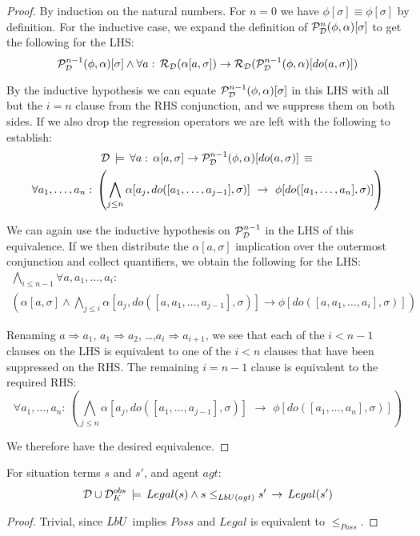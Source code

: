\begin{proof}
By induction on the natural numbers. For $n=0$ we have $\phi[\sigma]\equiv\phi[\sigma]$
by definition. For the inductive case, we expand the definition of
$\mathcal{P}_{\mathcal{D}}^{n}(\phi,\alpha)[\sigma]$ to get the following for the
LHS:\[
\mathcal{P}_{\mathcal{D}}^{n-1}(\phi,\alpha)[\sigma]\wedge\forall a:\,\mathcal{R}_{\mathcal{D}}(\alpha[a,\sigma])\rightarrow\mathcal{R}_{\mathcal{D}}(\mathcal{P}_{\mathcal{D}}^{n-1}(\phi,\alpha)[do(a,\sigma)])\]


By the inductive hypothesis we can equate $\mathcal{P}_{\mathcal{D}}^{n-1}(\phi,\alpha)[\sigma]$
in this LHS with all but the $i=n$ clause from the RHS conjunction,
and we suppress them on both sides. If we also drop the regression
operators we are left with the following to establish:\begin{multline*}
\mathcal{D}\,\models\,\forall a:\,\alpha[a,\sigma]\rightarrow\mathcal{P}_{\mathcal{D}}^{n-1}(\phi,\alpha)[do(a,\sigma)]\,\equiv\,\\
\forall a_{1},\dots,a_{n}:\,\left(\bigwedge_{j\leq n}\alpha[a_{j},do([a_{1},\dots,a_{j-1}],\sigma)]\,\,\rightarrow\,\,\phi[do([a_{1},\dots,a_{n}],\sigma)]\right)\end{multline*}


We can again use the inductive hypothesis on $\mathcal{P}_{\mathcal{D}}^{n-1}$ in
the LHS of this equivalence. If we then distribute the $\alpha[a,\sigma]$
implication over the outermost conjunction and collect quantifiers,
we obtain the following for the LHS:\begin{multline*}
\bigwedge_{i\leq n-1}\forall a,a_{1},\dots,a_{i}:\\
\left(\alpha[a,\sigma]\wedge\bigwedge_{j\leq i}\alpha[a_{j},do([a,a_{1},\dots,a_{j-1}],\sigma)]\rightarrow\phi[do([a,a_{1},\dots,a_{i}],\sigma)]\right)\end{multline*}


Renaming $a\Rightarrow a_{1}$, $a_{1}\Rightarrow a_{2}$, \ldots{},$a_{i}\Rightarrow a_{i+1}$,
we see that each of the $i<n-1$ clauses on the LHS is equivalent
to one of the $i<n$ clauses that have been suppressed on the RHS.
The remaining $i=n-1$ clause is equivalent to the required RHS: \[
\forall a_{1},\dots,a_{n}:\,\left(\bigwedge_{j\leq n}\alpha[a_{j},do([a_{1},\dots,a_{j-1}],\sigma)]\,\,\rightarrow\,\,\phi[do([a_{1},\dots,a_{n}],\sigma)]\right)\]


We therefore have the desired equivalence. 
\end{proof}
\begin{lemma}
\label{lem:pbu-implies-legal}For situation terms $s$ and $s'$,
and agent $agt$:\[
\mathcal{D}\cup\mathcal{D}_{K}^{obs}\,\models\, Legal(s)\wedge s\leq_{LbU(agt)}s'\,\rightarrow\, Legal(s')\]

\end{lemma}
\begin{proof}
Trivial, since $LbU$ implies $Poss$ and $Legal$ is equivalent
to $\leq_{Poss}$. 
\end{proof}
\medskip{}


